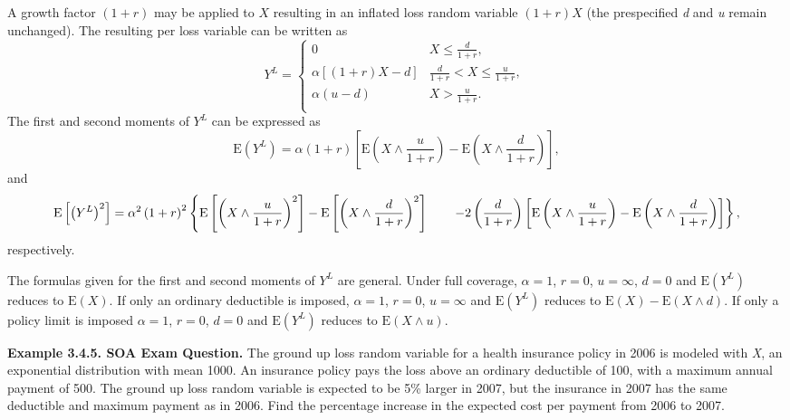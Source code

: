 \documentclass[]{book}
\theoremstyle{definition}
\theoremstyle{definition}
\theoremstyle{definition}
\theoremstyle{remark}
\begin{document}
A growth factor \(\left( 1 + r \right)\) may be applied to \(X\)
resulting in an inflated loss random variable \(\left( 1 + r \right)X\)
(the prespecified \emph{d} and \emph{u} remain unchanged). The resulting
per loss variable can be written as \[Y^{L} = \left\{ \begin{matrix}
0 & X \leq \frac{d}{1 + r}, \\
\alpha\left\lbrack \left( 1 + r \right)X - d \right\rbrack & \frac{d}{1 + r} <  X \leq \frac{u}{1 + r}, \\
\alpha\left( u - d \right) & X > \frac{u}{1 + r}. \\
\end{matrix} \right.\ \] The first and second moments of \(Y^{L}\) can
be expressed as
\[\mathrm{E}\left( Y^{L} \right) = \alpha\left( 1 + r \right)\left\lbrack \mathrm{E}\left( X \land \frac{u}{1 + r} \right) - \mathrm{E}\left( X \land \frac{d}{1 + r} \right) \right\rbrack,\]
and \[\mathrm{E}\left\lbrack \left( Y^{L} \right)^{2} 
\right\rbrack = \alpha^{2}\left( 1 + r \right)^{2}  \left\{ \mathrm{E}\left\lbrack \left( X \land \frac{u}{1 + r} \right)^{2} \right\rbrack - \mathrm{E}\left\lbrack \left( X \land \frac{d}{1 + r} \right)^{2} \right\rbrack  \right. \\
\left. \ \ \ \ \ - 2\left( \frac{d}{1 + r} \right)\left\lbrack \mathrm{E}\left( X \land \frac{u}{1 + r} \right) - \mathrm{E}\left( X \land \frac{d}{1 + r} \right) \right\rbrack \right\} ,\]
respectively.

The formulas given for the first and second moments of \(Y^{L}\) are
general. Under full coverage, \(\alpha = 1\), \(r = 0\), \(u = \infty\),
\(d = 0\) and \(\mathrm{E}\left( Y^{L} \right)\) reduces to
\(\mathrm{E}\left( X \right)\). If only an ordinary deductible is
imposed, \(\alpha = 1\), \(r = 0\), \(u = \infty\) and
\(\mathrm{E}\left( Y^{L} \right)\) reduces to
\(\mathrm{E}\left( X \right) - \mathrm{E}\left( X \land d \right)\). If
only a policy limit is imposed \(\alpha = 1\), \(r = 0\), \(d = 0\) and
\(\mathrm{E}\left( Y^{L} \right)\) reduces to
\(\mathrm{E}\left( X \land u \right)\).

\textbf{Example 3.4.5. SOA Exam Question.} The ground up loss random
variable for a health insurance policy in 2006 is modeled with \emph{X},
an exponential distribution with mean 1000. An insurance policy pays the
loss above an ordinary deductible of 100, with a maximum annual payment
of 500. The ground up loss random variable is expected to be 5\% larger
in 2007, but the insurance in 2007 has the same deductible and maximum
payment as in 2006. Find the percentage increase in the expected cost
per payment from 2006 to 2007.
\end{document}
